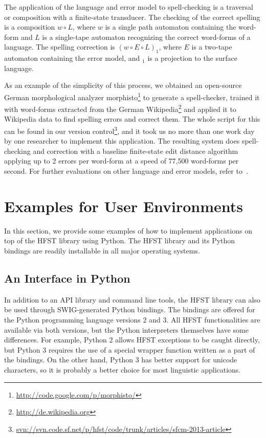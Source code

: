 \documentclass{llncs}
\begin{document}
The application of the language and error model to spell-checking is a
traversal or composition with a finite-state transducer. The checking of the correct spelling
is a composition $w \circ L$, where $w$ is a single path automaton containing
the word-form and $L$ is a single-tape automaton recognizing the correct
word-forms of a language. The spelling correction is $(w \circ E \circ L)_1$,
where $E$ is a two-tape automaton containing the error model, and $_1$ is
a projection to the surface language.

As an example of the simplicity of this process, we obtained an open-source
German morphological analyzer
morphisto\footnote{\url{http://code.google.com/p/morphisto/}} to generate a
spell-checker, trained it with word-forms extracted from the German
Wikipedia\footnote{\url{http://de.wikipedia.org}} and applied it to Wikipedia
data to find spelling errors and correct them. The whole script for this can be found
in our version
control\footnote{\url{svn://svn.code.sf.net/p/hfst/code/trunk/articles/sfcm-2013-article}},
and it took us no more than one work day by one researcher to implement this
application.  The resulting system does spell-checking and correction with
a baseline finite-state edit distance algorithm~\cite{pirinen2010finitestate}
applying up to 2 errors per word-form at a speed of 77,500 word-forms per second.
For further evaluations on other language and error models, refer
to~\cite{pirinen2012improving}.

\section{Examples for User Environments}\label{hfst:env-examples}

In this section, we provide some examples of how to implement applications on top of the HFST library using Python.
The HFST library and its Python bindings are readily installable in all major operating systems.

\subsection{An Interface in Python}

In addition to an API library and command line tools, the HFST library can
also be used through SWIG-generated Python bindings. The bindings are
offered for the Python programming language versions 2 and 3. All HFST
functionalities are available via both versions, but the Python
interpreters themselves have some differences. For example, Python 2
allows HFST exceptions to be caught directly, but Python 3 requires
the use of a special wrapper function written as a part of the
bindings. On the other hand, Python 3 has better support for unicode
characters, so it is probably a better choice for most linguistic
applications.
\end{document}
